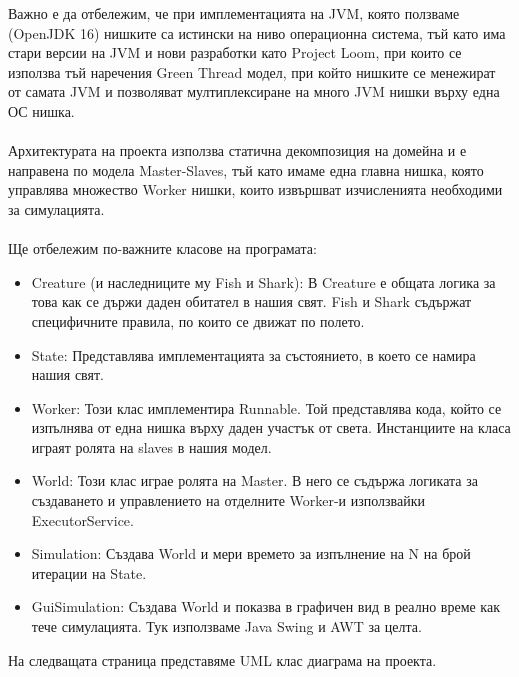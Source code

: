 \documentclass{article}
\begin{document}
Важно е да отбележим, че при имплементацията на JVM, която ползваме (OpenJDK 16) нишките са истински
на ниво операционна система, тъй като има стари версии на JVM и нови разработки като Project Loom,
при които се използва тъй наречения Green Thread модел, при който нишките се менежират от самата JVM
и позволяват мултиплексиране на много JVM нишки върху една ОС нишка.
\\
\\
Архитектурата на проекта използва статична декомпозиция на домейна и е направена по модела Master-Slaves,
тъй като имаме една главна нишка, която управлява множество Worker нишки, които извършват изчисленията
необходими за симулацията.
\\
\\
Ще отбележим по-важните класове на програмата:
\begin{itemize}
	\item Creature (и наследниците му Fish и Shark): В Creature е общата логика за това как се държи
		даден обитател в нашия свят. Fish и Shark съдържат специфичните правила, по които се движат
		по полето.
	\item State: Представлява имплементацията за състоянието, в което се намира нашия свят.
	\item Worker: Този клас имплементира Runnable. Той представлява кода, който се изпълнява от една нишка
		върху даден участък от света. Инстанциите на класа играят ролята на slaves в нашия модел.
	\item World: Този клас играе ролята на Master. В него се съдържа логиката за създаването и управлението на отделните
		Worker-и използвайки ExecutorService.
	\item Simulation: Създава World и мери времето за изпълнение на N на брой итерации на State.
	\item GuiSimulation: Създава World и показва в графичен вид в реално време как тече симулацията.
		Тук използваме Java Swing и AWT за целта.
\end{itemize}

На следващата страница представяме UML клас диаграма на проекта.

\newpage
\end{document}

